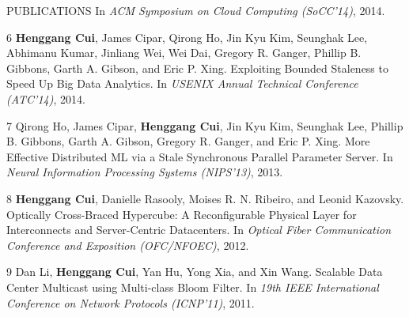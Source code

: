\documentclass{resume} %
\begin{document}
\begin{rSection}{PUBLICATIONS}
        In \emph{ACM Symposium on Cloud Computing (SoCC'14)},
        2014.
    \item
    [6]
        {\bf Henggang Cui}, James Cipar, Qirong Ho, Jin Kyu Kim, Seunghak Lee, Abhimanu Kumar,
        Jinliang Wei, Wei Dai, Gregory R. Ganger, Phillip B. Gibbons, Garth A. Gibson, and Eric P. Xing.
        Exploiting Bounded Staleness to Speed Up Big Data Analytics.
        In \emph{USENIX Annual Technical Conference (ATC'14)},
        2014.
    \item
    [7]
        Qirong Ho, James Cipar, {\bf Henggang Cui}, Jin Kyu Kim, Seunghak Lee,
        Phillip B. Gibbons, Garth A. Gibson, Gregory R. Ganger, and Eric P. Xing.
        More Effective Distributed ML via a Stale Synchronous Parallel Parameter Server.
        In \emph{Neural Information Processing Systems (NIPS'13)},
        2013.
    \item
    [8]
        {\bf Henggang Cui}, Danielle Rasooly, Moises R. N. Ribeiro, and Leonid Kazovsky.
        Optically Cross-Braced Hypercube: A Reconfigurable Physical Layer for
        Interconnects and Server-Centric Datacenters.
        In \emph{Optical Fiber Communication Conference and Exposition (OFC/NFOEC)},
        2012.
    \item
    [9]
        Dan Li, {\bf Henggang Cui}, Yan Hu, Yong Xia, and Xin Wang.
        Scalable Data Center Multicast using Multi-class Bloom Filter.
        In \emph{19th IEEE International Conference on Network Protocols (ICNP'11)},
        2011.
\end{rSection}
\end{document}
